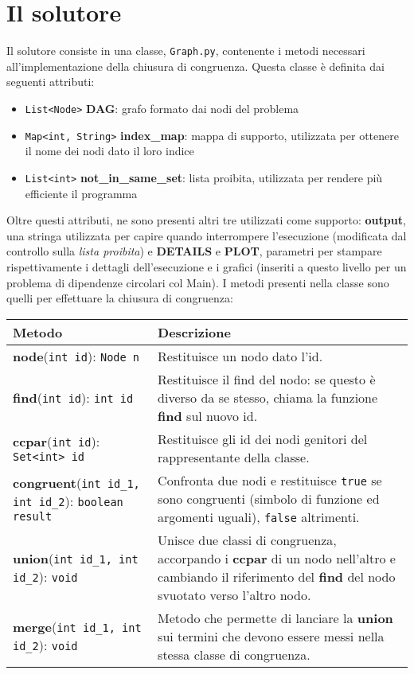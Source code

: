 \section{Il solutore}
Il solutore consiste in una classe, \texttt{Graph.py}, contenente i metodi necessari all'implementazione
della chiusura di congruenza. Questa classe è definita dai seguenti attributi:
\begin{itemize}
    \item \texttt{List<Node>} \textbf{DAG}: grafo formato dai nodi del problema
    \item \texttt{Map<int, String>} \textbf{index\_map}: mappa di supporto, utilizzata per ottenere il nome dei nodi dato
                                                        il loro indice
    \item \texttt{List<int>} \textbf{not\_in\_same\_set}: lista proibita, utilizzata per rendere più efficiente il programma
\end{itemize}
Oltre questi attributi, ne sono presenti altri tre utilizzati come supporto: \textbf{output}, una stringa utilizzata per
capire quando interrompere l'esecuzione (modificata dal controllo sulla \textit{lista proibita}) e \textbf{DETAILS} e
\textbf{PLOT}, parametri per stampare rispettivamente i dettagli dell'esecuzione e i grafici (inseriti a questo livello
per un problema di dipendenze circolari col Main).
I metodi presenti nella classe sono quelli per effettuare la chiusura di congruenza:
\begin{center}
    \label{tab:methods}
    \begin{tabular}{|m{6cm}|m{6cm}|}
        \hline
        \textbf{Metodo} & \textbf{Descrizione} \\ \hline
         \textbf{node}(\texttt{int id}): \texttt{Node n} & Restituisce un nodo dato l'id. \\ \hline
         \textbf{find}(\texttt{int id}): \texttt{int id} & Restituisce il find del nodo: se questo è diverso
                    da se stesso, chiama la funzione \textbf{find} sul nuovo id. \\ \hline
         \textbf{ccpar}(\texttt{int id}): \texttt{Set<int> id} & Restituisce gli id dei nodi genitori del rappresentante
                    della classe. \\ \hline
        \textbf{congruent}(\texttt{int id\_1, int id\_2}): \texttt{boolean result} & Confronta due nodi e restituisce
                    \texttt{true} se sono congruenti (simbolo di funzione ed argomenti uguali),
                    \texttt{false} altrimenti. \\ \hline
        \textbf{union}(\texttt{int id\_1, int id\_2}): \texttt{void} & Unisce due classi di congruenza,
                    accorpando i \textbf{ccpar} di un nodo nell'altro e cambiando il riferimento del \textbf{find} del
                    nodo svuotato verso l'altro nodo. \\ \hline
        \textbf{merge}(\texttt{int id\_1, int id\_2}): \texttt{void} & Metodo che permette di lanciare la \textbf{union}
                    sui termini che devono essere messi nella stessa classe di congruenza. \\ \hline
    \end{tabular}
\end{center}

